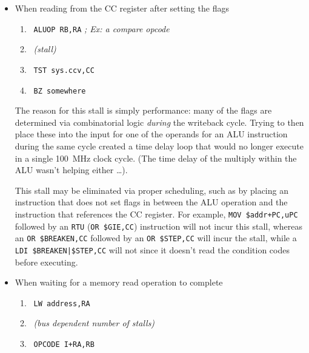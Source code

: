 \documentclass{gqtekspec}
\begin{document}
\begin{itemize}
\item When reading from the CC register after setting the flags
\begin{enumerate}
\item\ {\tt ALUOP RB,RA} {\em ; Ex: a compare opcode}
\item\ {\em (stall)}
\item\ {\tt TST sys.ccv,CC}
\item\ {\tt BZ somewhere}
\end{enumerate}

	The reason for this stall is simply performance: many of the flags are
	determined via combinatorial logic {\em during} the writeback cycle.
	Trying to then place these into the input for one of the operands for an
	ALU instruction during the same cycle
	created a time delay loop that would no longer execute in a single
	100~MHz clock cycle.  (The time delay of the multiply within the ALU
	wasn't helping either \ldots). 

	This stall may be eliminated via proper scheduling, such as by placing
	an instruction that does not set flags in between the ALU operation
	and the instruction that references the CC register.  For example,
	{\tt MOV \$addr+PC,uPC} followed by an {\tt RTU} ({\tt OR \$GIE,CC})
	instruction will not incur this stall, whereas an
	{\tt OR \$BREAKEN,CC} followed by an {\tt OR \$STEP,CC} will incur the
	stall, while a {\tt LDI \$BREAKEN|\$STEP,CC} will not since it doesn't
	read the condition codes before executing.

\item When waiting for a memory read operation to complete
\begin{enumerate}
\item\ {\tt LW address,RA}
\item\ {\em (bus dependent number of stalls)}
\item\ {\tt OPCODE I+RA,RB}
\end{enumerate}


\end{itemize}
\end{document}
